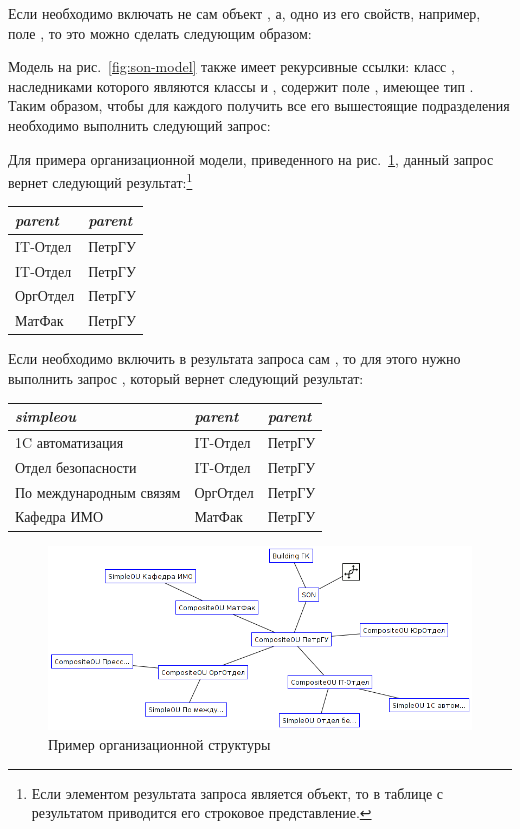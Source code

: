 Если необходимо включать не сам объект , а, 
одно из его свойств, например, поле , то это можно сделать следующим образом:

Модель на рис.~\ref{fig:son-model} также имеет рекурсивные ссылки: 
класс , наследниками которого являются классы  и ,
содержит поле , имеющее тип . Таким образом, чтобы для каждого 
 получить все его вышестоящие подразделения необходимо выполнить следующий запрос:

Для примера организационной модели, приведенного на рис.~\ref{fig:model-snapshot-org}, 
данный запрос вернет следующий результат:\footnote{Если элементом результата запроса 
является объект, то в таблице с результатом приводится его строковое представление.}


\begin{center}
    \begin{tabular}{|l|l|}
	\hline
	\it{parent} & \it{parent}\\[5pt]
	\hline
	\hline
	IT-Отдел & ПетрГУ \\
	\hline
	IT-Отдел & ПетрГУ \\
	\hline
	ОргОтдел & ПетрГУ \\
	\hline
	МатФак & ПетрГУ \\
	\hline
    \end{tabular}
\end{center}

Если необходимо включить в результата запроса сам , то для этого нужно
выполнить запрос
,
который вернет следующий результат:
\begin{center}
    \begin{tabular}{|l|l|l|}
	\hline
	\it{simpleou} & \it{parent} & \it{parent}\\[5pt]
	\hline
	\hline
	1C автоматизация & IT-Отдел & ПетрГУ \\
	\hline
	Отдел безопасности & IT-Отдел & ПетрГУ \\
	\hline
	По международным связям & ОргОтдел & ПетрГУ \\
	\hline
	Кафедра ИМО & МатФак & ПетрГУ \\
	\hline
    \end{tabular}
\end{center}


\begin{figure}[hbt]
  \centering
  \includegraphics[scale=0.5]{figures/model_snapshot_org_petrsu}
  \caption{Пример организационной структуры}
  \label{fig:model-snapshot-org}
\end{figure}


